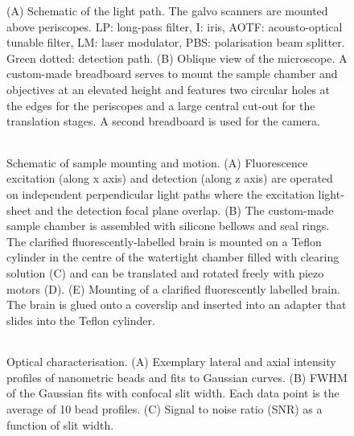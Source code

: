 \documentclass[12pt]{spieman}  %
\begin{document}
\begin{spacing}{2}
\begin{table}[t!]
\begin{tabular}{lrcl}
		\end{tabular}
\end{table}

\newpage
\pagebreak

		\begin{figure}
   \begin{center}
   \begin{tabular}{c}
   \end{tabular}
   \end{center}
   \caption{\label{fig:excitation} (A) Schematic of the light path. The galvo scanners are mounted above periscopes. LP: long-pass filter, I: iris, AOTF: acousto-optical tunable filter, LM: laser modulator, PBS: polarisation beam splitter. Green dotted: detection path. (B) Oblique view of the microscope. A custom-made breadboard serves to mount the sample chamber and objectives at an elevated height and features two circular holes at the edges for the periscopes and a large central cut-out for the translation stages. A second breadboard is used for the camera.} 
   \end{figure}
	
	\begin{figure}
   \begin{center}
   \begin{tabular}{c}
   \end{tabular}
   \end{center}
   \caption{\label{fig:frame2} Schematic of sample mounting and motion. (A) Fluorescence excitation (along x axis) and detection (along z axis) are operated on independent perpendicular light paths where the excitation light-sheet and the detection focal plane overlap. (B) The custom-made sample chamber is assembled with silicone bellows and seal rings. The clarified fluorescently-labelled brain is mounted on a Teflon cylinder in the centre of the watertight chamber filled with clearing solution (C) and can be translated and rotated freely with piezo motors (D). (E) Mounting of a clarified fluorescently labelled brain. The brain is glued onto a coverslip and inserted into an adapter that slides into the Teflon cylinder.} 
   \end{figure}		

\begin{figure}
   \begin{center}
   \begin{tabular}{c}
   \end{tabular}
   \end{center}
   \caption{\label{fig:origin} Optical characterisation. (A) Exemplary lateral and axial intensity profiles of nanometric beads and fits to Gaussian curves. (B) FWHM of the Gaussian fits with confocal slit width. Each data point is the average of 10 bead profiles. (C) Signal to noise ratio (SNR) as a function of slit width.} 
\end{figure}


\end{spacing}
\end{document}
